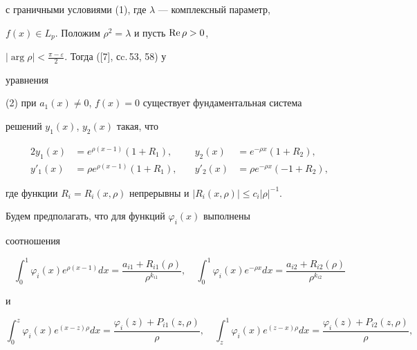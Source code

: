 с граничными условиями (1), где $\lambda$ --- комплексный параметр,  


$f(x)\in L_p$. Положим $\rho^2=\lambda$ и пусть $\operatorname{Re}\rho>0$, 


$|\arg\rho|<\frac{\pi-\varepsilon}{2}$. Тогда ([7], сc.\,53, 58) у 


уравнения 


(2) при $a_1(x)\ne0$, $f(x)=0$ существует фундаментальная система 


решений $y_1(x)$, $y_2(x)$ такая, что 


\begin{alignat*}{2} 


y_1(x)&=e^{\rho(x-1)}(1+R_1), &\quad 


y_2(x)&=e^{-\rho x}(1+R_2), \\ 


% 


y'_1(x)&=\rho e^{\rho(x-1)}(1+R_1), &\quad 


y'_2(x)&=\rho e^{-\rho x}(-1+R_2), 


\end{alignat*} 


где функции $R_i=R_i(x,\rho)$ непрерывны и $|R_i(x,\rho)|\le 


c_i|\rho|^{-1}$. 


 


Будем предполагать, что для функций $\varphi_i(x)$ выполнены 


соотношения 


\begin{equation} 


\int^1_0\varphi_i(x)e^{\rho(x-1)}dx= 


\frac{a_{i1}+R_{i1}(\rho)}{\rho^{k_{i1}}},\quad 


\int^1_0\varphi_i(x)e^{-\rho x}dx= 


\frac{a_{i2}+R_{i2}(\rho)}{\rho^{k_{i2}}} 


\end{equation} 


и 


\begin{equation} 


\int^z_0\varphi_i(x)e^{(x-z)\rho}dx= 


\frac{\varphi_i(z)+P_{i1}(z,\rho)}{\rho},\quad 


\int^1_z\varphi_i(x)e^{(z-x)\rho}dx= 


\frac{\varphi_i(z)+P_{i2}(z,\rho)}{\rho}, 


\end{equation} 


